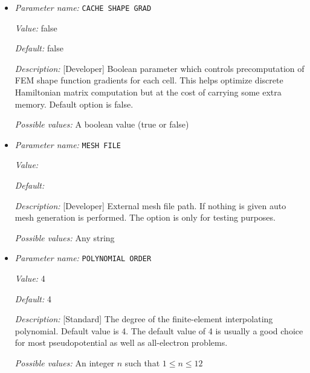 \begin{itemize}
\item {\it Parameter name:} {\tt CACHE SHAPE GRAD}
\label{parameters:Finite element mesh parameters/CACHE SHAPE GRAD}
\label{parameters:Finite_20element_20mesh_20parameters/CACHE_20SHAPE_20GRAD}


{\it Value:} false


{\it Default:} false


{\it Description:} [Developer] Boolean parameter which controls precomputation of FEM shape function gradients for each cell. This helps optimize discrete Hamiltonian matrix computation but at the cost of carrying some extra memory. Default option is false.


{\it Possible values:} A boolean value (true or false)
\item {\it Parameter name:} {\tt MESH FILE}
\label{parameters:Finite element mesh parameters/MESH FILE}
\label{parameters:Finite_20element_20mesh_20parameters/MESH_20FILE}


{\it Value:} 


{\it Default:} 


{\it Description:} [Developer] External mesh file path. If nothing is given auto mesh generation is performed. The option is only for testing purposes.


{\it Possible values:} Any string
\item {\it Parameter name:} {\tt POLYNOMIAL ORDER}
\label{parameters:Finite element mesh parameters/POLYNOMIAL ORDER}
\label{parameters:Finite_20element_20mesh_20parameters/POLYNOMIAL_20ORDER}


{\it Value:} 4


{\it Default:} 4


{\it Description:} [Standard] The degree of the finite-element interpolating polynomial. Default value is 4. The default value of 4 is usually a good choice for most pseudopotential as well as all-electron problems.


{\it Possible values:} An integer $n$ such that $1\leq n \leq 12$
\end{itemize}



